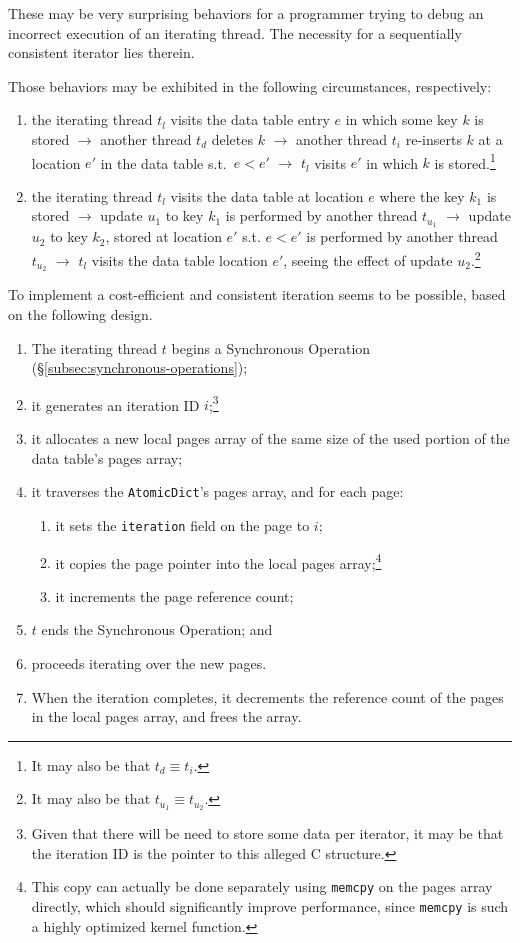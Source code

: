 These may be very surprising behaviors for a programmer trying to debug an incorrect execution of an iterating thread.
The necessity for a sequentially consistent iterator lies therein.

Those behaviors may be exhibited in the following circumstances, respectively:
\begin{enumerate}
	\item the iterating thread $t_l$ visits the data table entry $e$ in which some key $k$ is stored $\rightarrow$ another thread $t_d$ deletes $k$ $\rightarrow$ another thread $t_i$ re-inserts $k$ at a location $e'$ in the data table s.t.\ $e < e'$ $\rightarrow$ $t_l$ visits $e'$ in which $k$ is stored.\footnote{%
		It may also be that $t_d \equiv t_i$.
	}
	\item the iterating thread $t_l$ visits the data table at location $e$ where the key $k_1$ is stored $\rightarrow$ update $u_1$ to key $k_1$ is performed by another thread $t_{u_1}$ $\rightarrow$ update $u_2$ to key $k_2$, stored at location $e'$ s.t. $e < e'$ is performed by another thread $t_{u_2}$ $\rightarrow$ $t_l$ visits the data table location $e'$, seeing the effect of update $u_2$.\footnote{%
		It may also be that $t_{u_1} \equiv t_{u_2}$.
	}
\end{enumerate}

To implement a cost-efficient and consistent iteration seems to be possible, based on the following design.

\begin{enumerate}
	\item The iterating thread $t$ begins a Synchronous Operation (\S\ref{subsec:synchronous-operations});
	\item it generates an iteration ID $i$;\footnote{%
		Given that there will be need to store some data per iterator, it may be that the iteration ID is the pointer to this alleged C structure.
	}
	\item it allocates a new local pages array of the same size of the used portion of the data table's pages array;
	\item it traverses the \texttt{AtomicDict}'s pages array, and for each page:
	\begin{enumerate}
		\item it sets the \texttt{iteration} field on the page to $i$;
		\item it copies the page pointer into the local pages array;\footnote{%
			This copy can actually be done separately using \texttt{memcpy} on the pages array directly, which should significantly improve performance, since \texttt{memcpy} is such a highly optimized kernel function.
		}
		\item it increments the page reference count;
	\end{enumerate}
	\item $t$ ends the Synchronous Operation; and
	\item proceeds iterating over the new pages.
	\item When the iteration completes, it decrements the reference count of the pages in the local pages array, and frees the array.
\end{enumerate}

